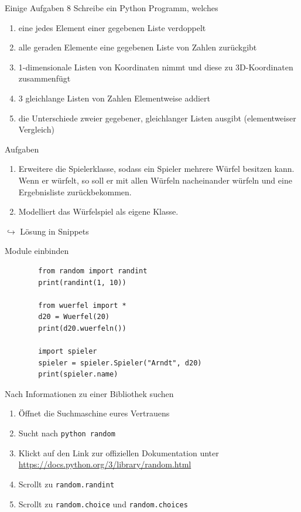 \begin{frame}{Einige Aufgaben 8}
	Schreibe ein Python Programm, welches
	\begin{enumerate}
		\item eine jedes Element einer gegebenen Liste verdoppelt
		\item alle geraden Elemente eine gegebenen Liste von Zahlen zurückgibt
		\item 1-dimensionale Listen von Koordinaten nimmt und diese zu 3D-Koordinaten zusammenfügt
		\item 3 gleichlange Listen von Zahlen Elementweise addiert
		\item die Unterschiede zweier gegebener, gleichlanger Listen ausgibt (elementweiser Vergleich)
	\end{enumerate}
\end{frame}

\begin{frame}{Aufgaben}
	\begin{enumerate}
		\item Erweitere die Spielerklasse, sodass ein Spieler mehrere Würfel besitzen kann. Wenn er würfelt, so soll er mit allen Würfeln nacheinander würfeln und eine Ergebnisliste zurückbekommen.
		\item Modelliert das Würfelspiel als eigene Klasse.
	\end{enumerate}
	$\hookrightarrow$ Lösung in Snippets
\end{frame}

\begin{frame}[fragile]{Module einbinden}
	\begin{lstlisting}
		from random import randint
		print(randint(1, 10))
		
		from wuerfel import *
		d20 = Wuerfel(20)
		print(d20.wuerfeln())
		
		import spieler
		spieler = spieler.Spieler("Arndt", d20)
		print(spieler.name)
	\end{lstlisting}
\end{frame}

\begin{frame}{Nach Informationen zu einer Bibliothek suchen}
	\begin{enumerate}
		\item Öffnet die Suchmaschine eures Vertrauens
		\item Sucht nach \texttt{python random}
		\item Klickt auf den Link zur offiziellen Dokumentation unter \url{https://docs.python.org/3/library/random.html}
		\item Scrollt zu \texttt{random.randint}
		\item Scrollt zu \texttt{random.choice} und \texttt{random.choices}
	\end{enumerate}
\end{frame}

